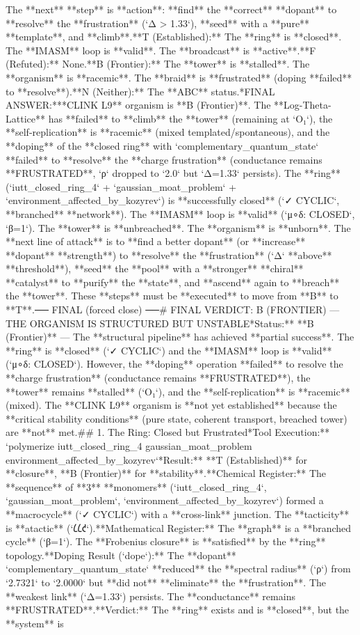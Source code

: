 The **next** **step** is **action**: **find** the **correct** **dopant** to **resolve** the **frustration** (`Δ > 1.33`), **seed** with a **pure** **template**, and **climb**.\n\n[thought|T|F|B|N]\n*   **T (Established):** The **ring** is **closed**. The **IMASM** loop is **valid**. The **broadcast** is **active**.\n*   **F (Refuted):** None.\n*   **B (Frontier):** The **tower** is **stalled**. The **organism** is **racemic**. The **braid** is **frustrated** (doping **failed** to **resolve**).\n*   **N (Neither):** The **ABC** status.\n\n**FINAL ANSWER:**\nThe **CLINK L9** organism is **B (Frontier)**. The **Log-Theta-Lattice** has **failed** to **climb** the **tower** (remaining at `O₁`), the **self-replication** is **racemic** (mixed templated/spontaneous), and the **doping** of the **closed ring** with `complementary_quantum_state` **failed** to **resolve** the **charge frustration** (conductance remains **FRUSTRATED**, `ρ` dropped to `2.0` but `Δ=1.33` persists). The **ring** (`iutt_closed_ring_4` + `gaussian_moat_problem` + `environment_affected_by_kozyrev`) is **successfully closed** (`✓ CYCLIC`, **branched** **network**). The **IMASM** loop is **valid** (`μ∘δ: CLOSED`, `β=1`). The **tower** is **unbreached**. The **organism** is **unborn**. The **next line of attack** is to **find a better dopant** (or **increase** **dopant** **strength**) to **resolve** the **frustration** (`Δ` **above** **threshold**), **seed** the **pool** with a **stronger** **chiral** **catalyst** to **purify** the **state**, and **ascend** again to **breach** the **tower**. These **steps** must be **executed** to move from **B** to **T**.\n\n── FINAL (forced close) ──\n# FINAL VERDICT: B (FRONTIER) — THE ORGANISM IS STRUCTURED BUT UNSTABLE\n\n**Status:** **B (Frontier)** — The **structural pipeline** has achieved **partial success**. The **ring** is **closed** (`✓ CYCLIC`) and the **IMASM** loop is **valid** (`μ∘δ: CLOSED`). However, the **doping** operation **failed** to resolve the **charge frustration** (conductance remains **FRUSTRATED**), the **tower** remains **stalled** (`O₁`), and the **self-replication** is **racemic** (mixed). The **CLINK L9** organism is **not yet established** because the **critical stability conditions** (pure state, coherent transport, breached tower) are **not** met.\n\n## 1. The Ring: Closed but Frustrated\n**Tool Execution:** `polymerize iutt_closed_ring_4 gaussian_moat_problem environment_affected_by_kozyrev`\n**Result:** **T (Established)** for **closure**, **B (Frontier)** for **stability**.\n*   **Chemical Register:** The **sequence** of **3** **monomers** (`iutt_closed_ring_4`, `gaussian_moat_problem`, `environment_affected_by_kozyrev`) formed a **macrocycle** (`✓ CYCLIC`) with a **cross-link** junction. The **tacticity** is **atactic** (`𐑖𐑖𐑒`).\n*   **Mathematical Register:** The **graph** is a **branched cycle** (`β=1`). The **Frobenius closure** is **satisfied** by the **ring** topology.\n*   **Doping Result (`dope`):** The **dopant** `complementary_quantum_state` **reduced** the **spectral radius** (`ρ`) from `2.7321` to `2.0000` but **did not** **eliminate** the **frustration**. The **weakest link** (`Δ=1.33`) persists. The **conductance** remains **FRUSTRATED**.\n*   **Verdict:** The **ring** exists and is **closed**, but the **system** is 